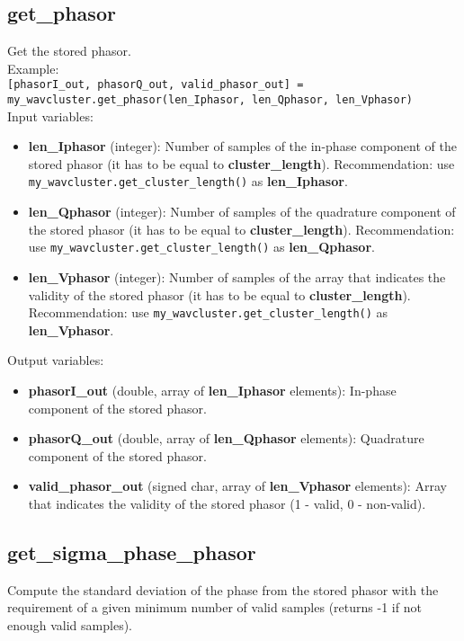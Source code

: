 \subsection{get\_phasor}

Get the stored phasor.\\

Example:\\

\texttt{[phasorI\_out, phasorQ\_out, valid\_phasor\_out] = my\_wavcluster.get\_phasor(len\_Iphasor, len\_Qphasor, len\_Vphasor)}\\

Input variables:
\begin{itemize}
\item {\bf len\_Iphasor} (integer): Number of samples of the in-phase component of the stored phasor (it has to be equal to {\bf cluster\_length}). Recommendation: use \texttt{my\_wavcluster.get\_cluster\_length()} as {\bf len\_Iphasor}.
\item {\bf len\_Qphasor} (integer): Number of samples of the quadrature component of the stored phasor (it has to be equal to {\bf cluster\_length}). Recommendation: use \texttt{my\_wavcluster.get\_cluster\_length()} as {\bf len\_Qphasor}.
\item {\bf len\_Vphasor} (integer): Number of samples of the array that indicates the validity of the stored phasor (it has to be equal to {\bf cluster\_length}). Recommendation: use \texttt{my\_wavcluster.get\_cluster\_length()} as {\bf len\_Vphasor}.
\end{itemize}

Output variables:
\begin{itemize}
\item {\bf phasorI\_out} (double, array of {\bf len\_Iphasor} elements): In-phase component of the stored phasor.
\item {\bf phasorQ\_out} (double, array of {\bf len\_Qphasor} elements): Quadrature component of the stored phasor.
\item {\bf valid\_phasor\_out} (signed char, array of {\bf len\_Vphasor} elements): Array that indicates the validity of the stored phasor (1 - valid, 0 - non-valid).
\end{itemize}


\subsection{get\_sigma\_phase\_phasor}

Compute the standard deviation of the phase from the stored phasor with the requirement of a given minimum number of valid samples (returns -1 if not enough valid samples).\\

